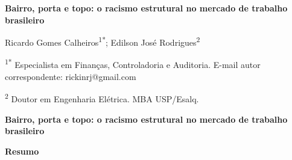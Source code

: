 \documentclass[11pt, a4paper, oneside]{article}
\begin{document}
\thispagestyle{fancy}
\begin{singlespace}

\begin{center}
{\fontsize{11}{13}\selectfont\bfseries
Bairro, porta e topo: o racismo estrutural no mercado de trabalho
brasileiro\par}
\end{center}

\vspace{2\baselineskip}      %

\begin{center}
{\fontsize{11}{13}\selectfont
Ricardo Gomes Calheiros\textsuperscript{1*}; Edilson José Rodrigues\textsuperscript{2}\par}
\end{center}

\vspace{\baselineskip}       %

{\fontsize{9}{11}\selectfont
\noindent\textsuperscript{1*} Especialista em Finanças, Controladoria e Auditoria.
E-mail autor correspondente: rickinrj@gmail.com\par
\noindent\textsuperscript{2} Doutor em Engenharia Elétrica. MBA USP/Esalq.\par}

\end{singlespace}

\newpage


\begin{center}
{\fontsize{11}{14}\selectfont\bfseries
Bairro, porta e topo: o racismo estrutural no mercado de trabalho
brasileiro\par}
\end{center}

\vspace{\baselineskip}
\noindent\textbf{Resumo}
\vspace{\baselineskip}
\end{document}
